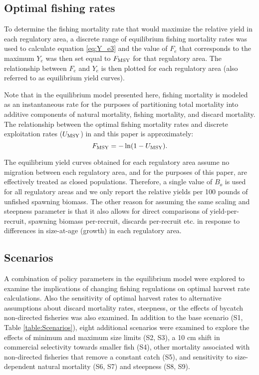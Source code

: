 \subsection*{Optimal fishing rates} %
\label{sub:optimal_fishing_rates}
To determine the fishing mortality rate that would maximize the relative yield in each regulatory area, a discrete range of equilibrium fishing mortality rates was used to calculate equation \eqref{eq:Y_e3} and the value of $F_e$ that corresponds to the maximum $Y_e$ was then set equal to $F_{\rm{MSY}}$ for that regulatory area. The relationship between $F_e$ and $Y_e$ is then plotted for each regulatory area (also referred to as equilibrium yield curves). 

Note that in the equilibrium model presented here, fishing mortality is modeled as an instantaneous rate for the purposes of partitioning total mortality  into additive components of natural mortality, fishing mortality, and discard mortality.  The relationship between the optimal fishing mortality rates and discrete exploitation rates ($U_{\rm{MSY}}$) in \cite{clark2006assessment} and this paper is approximately:
\[
F_{\rm{MSY}} = -\ln(1-U_{\rm{MSY}}).
\]

The equilibrium yield curves obtained for each regulatory area assume no migration between each regulatory area, and for the purposes of this paper, are effectively treated as closed populations.  Therefore, a single value of $B_o$ is used for all regulatory areas and we only report the relative yields per 100 pounds of unfished spawning biomass.  The other reason for assuming the same scaling and steepness parameter is that it also allows for direct  comparisons of yield-per-recruit, spawning biomass per-recruit, discards per-recruit etc. in response to differences in size-at-age (growth) in each regulatory area.  


\subsection*{Scenarios} %
\label{sub:scenarios}

A combination of policy parameters in the equilibrium model were explored to examine the implications of changing fishing regulations on optimal harvest rate calculations.  Also the sensitivity of optimal harvest rates to alternative assumptions about discard mortality rates, steepness, or the effects of bycatch non-directed fisheries was also examined.  In addition to the base scenario (S1, Table \ref{table:Scenarios}), eight additional scenarios were examined to explore the effects of minimum and maximum size limits (S2, S3), a 10 cm shift in commercial selectivity towards smaller fish (S4), other mortality associated with non-directed fisheries that remove a constant catch (S5), and sensitivity to size-dependent natural mortality (S6, S7) and steepness (S8, S9).




